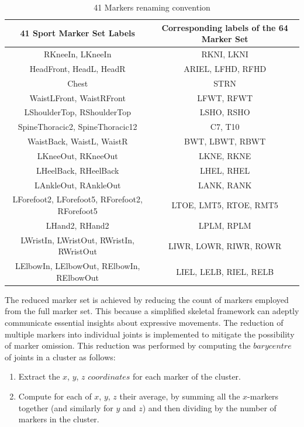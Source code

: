 \begin{table}[H]
    \centering
    \begin{tabular}{|c|c|}
    \hline
    \textbf{41 Sport Marker Set Labels} & \textbf{Corresponding labels of the 64 Marker Set} \\
    \hline
    RKneeIn, LKneeIn & RKNI, LKNI \\
    HeadFront, HeadL, HeadR & ARIEL, LFHD, RFHD \\
    Chest & STRN \\
    WaistLFront, WaistRFront & LFWT, RFWT \\
    LShoulderTop, RShoulderTop & LSHO, RSHO \\
    SpineThoracic2, SpineThoracic12 & C7, T10 \\
    WaistBack, WaistL, WaistR & BWT, LBWT, RBWT \\
    LKneeOut, RKneeOut & LKNE, RKNE \\
    LHeelBack, RHeelBack & LHEL, RHEL \\
    LAnkleOut, RAnkleOut & LANK, RANK \\
    LForefoot2, LForefoot5, RForefoot2, RForefoot5& LTOE, LMT5, RTOE, RMT5\\
    LHand2, RHand2 & LPLM, RPLM \\
    LWristIn, LWristOut, RWristIn, RWristOut & LIWR, LOWR, RIWR, ROWR \\
    LElbowIn, LElbowOut, RElbowIn, RElbowOut & LIEL, LELB, RIEL, RELB \\
    \hline
    \end{tabular}
    \caption{41 Markers renaming convention}
    \label{tab:marker_mapping}
\end{table}

The reduced marker set is achieved by reducing the count of markers employed from the full marker set.
This because a simplified skeletal framework can adeptly communicate essential insights about expressive movements.
The reduction of multiple markers into individual joints is implemented to mitigate the possibility of marker omission.
This reduction was performed by computing the $barycentre$ of joints in a cluster as follows:
\begin{enumerate}
    \item Extract the $x$, $y$, $z$ $coordinates$ for each marker of the cluster.
    \item Compute for each of $x$, $y$, $z$ their average, by summing all the $x$-markers together
    (and similarly for $y$ and $z$) and then dividing by the number of markers in the cluster.
\end{enumerate} 



